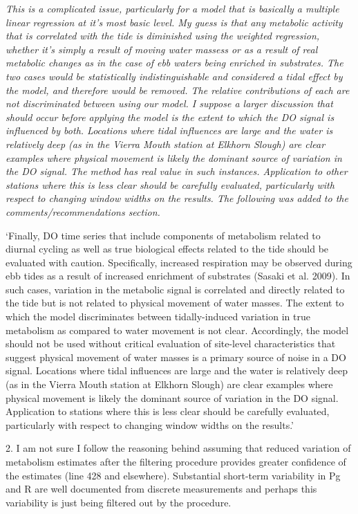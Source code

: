 \documentclass[letterpaper,12pt]{article}\usepackage[]{graphicx}\usepackage[]{color}
\begin{document}
{\it This is a complicated issue, particularly for a model that is basically a multiple linear regression at it's most basic level.  My guess is that any metabolic activity that is correlated with the tide is diminished using the weighted regression, whether it's simply a result of moving water massess or as a result of real metabolic changes as in the case of ebb waters being enriched in substrates.  The two cases would be statistically indistinguishable and considered a tidal effect by the model, and therefore would be removed.  The relative contributions of each are not discriminated between using our model.  I suppose a larger discussion that should occur before applying the model is the extent to which the DO signal is influenced by both.  Locations where tidal influences are large and the water is relatively deep (as in the Vierra Mouth station at Elkhorn Slough) are clear examples where physical movement is likely the dominant source of variation in the DO signal.  The method has real value in such instances.  Application to other stations where this is less clear should be carefully evaluated, particularly with respect to changing window widths on the results.  The following was added to the comments/recommendations section.

`Finally, DO time series that include components of metabolism related to diurnal cycling as well as true biological effects related to the tide should be evaluated with caution.  Specifically, increased respiration may be observed during ebb tides as a result of increased enrichment of substrates (Sasaki et al. 2009).  In such cases, variation in the metabolic signal is correlated and directly related to the tide but is not related to physical movement of water masses.  The extent to which the model discriminates between tidally-induced variation in true metabolism as compared to water movement is not clear.  Accordingly, the model should not be used without critical evaluation of site-level characteristics that suggest physical movement of water masses is a primary source of noise in a DO signal. Locations where tidal influences are large and the water is relatively deep (as in the Vierra Mouth station at Elkhorn Slough) are clear examples where physical movement is likely the dominant source of variation in the DO signal.   Application to stations where this is less clear should be carefully evaluated, particularly with respect to changing window widths on the results.' 

}

2. I am not sure I follow the reasoning behind assuming that reduced variation of metabolism estimates after the filtering procedure provides greater confidence of the estimates (line 428 and elsewhere). Substantial short-term variability in Pg and R are well documented from discrete measurements and perhaps this variability is just being filtered out by the procedure.
\end{document}
